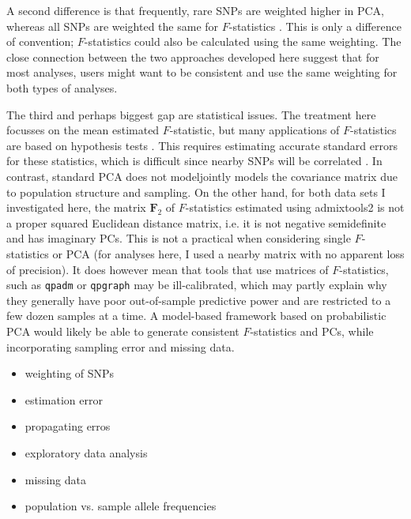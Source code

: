 \documentclass[12pt,a4pape, fullpage]{article}
\newcommand{\MF}{\mathbf{F}_2} %
\begin{document}
A second difference is that frequently, rare SNPs are weighted higher in PCA, whereas all SNPs are weighted the same for $F$-statistics \citep{patterson2006}. This is only a difference of convention; $F$-statistics could also be calculated using the same weighting. The close connection between the two approaches developed here suggest that for most analyses, users might want to be consistent and use the same weighting for both types of analyses. 

The third and perhaps biggest gap are statistical issues. The treatment here focusses on the mean estimated $F$-statistic, but many  applications of $F$-statistics are based on hypothesis tests \citep{patterson2012}. This requires estimating accurate standard errors for these statistics, which is difficult since nearby SNPs will be correlated \citep{hahn2018}. In contrast, standard PCA does not modeljointly models the covariance matrix due to population structure and sampling. On the other hand, for both data sets I investigated here, the matrix $\MF$ of $F$-statistics estimated using admixtools2 is not a proper squared Euclidean distance matrix, i.e. it is not negative semidefinite and has imaginary PCs. This is not a practical when considering single $F$-statistics or PCA (for analyses here, I used a nearby matrix  \citep{higham2002} with no apparent loss of precision). It does however mean that tools that use matrices of $F$-statistics, such as \texttt{qpadm} or \texttt{qpgraph} may be ill-calibrated, which may partly explain why they generally have poor out-of-sample predictive power and are restricted to a few dozen samples at a time. A model-based framework based on probabilistic PCA \citep{meisner2021, agrawal2020, hastie2015} would likely be able to generate consistent $F$-statistics and PCs, while incorporating sampling error and missing data.

\begin{itemize}
    \item weighting of SNPs
    \item estimation error
    \item propagating erros
    \item exploratory data analysis
    \item missing data
    \item population vs. sample allele frequencies
\end{itemize}

\appendix
\end{document}
